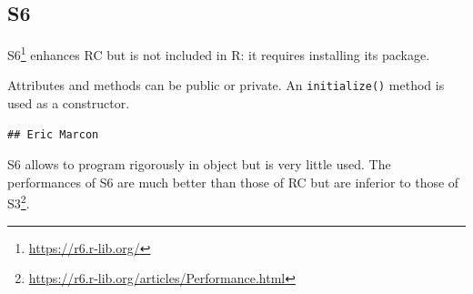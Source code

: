 \documentclass[
  12pt,
  american,
  a4paper,
  extrafontsizes,onecolumn,openright
  ]{memoir}
\newenvironment{Shaded}{\begin{snugshade}}{\end{snugshade}}
\newcommand{\AttributeTok}[1]{\textcolor[rgb]{0.13,0.29,0.53}{#1}}
\newcommand{\ConstantTok}[1]{\textcolor[rgb]{0.56,0.35,0.01}{#1}}
\newcommand{\ControlFlowTok}[1]{\textcolor[rgb]{0.13,0.29,0.53}{\textbf{#1}}}
\newcommand{\FunctionTok}[1]{\textcolor[rgb]{0.13,0.29,0.53}{\textbf{#1}}}
\newcommand{\NormalTok}[1]{#1}
\newcommand{\OtherTok}[1]{\textcolor[rgb]{0.56,0.35,0.01}{#1}}
\newcommand{\SpecialCharTok}[1]{\textcolor[rgb]{0.81,0.36,0.00}{\textbf{#1}}}
\newcommand{\StringTok}[1]{\textcolor[rgb]{0.31,0.60,0.02}{#1}}
\newlength{\rf}
\begin{document}
\subsection{S6}\label{s6}

S6\footnote{\url{https://r6.r-lib.org/}} enhances RC but is not included in R: it requires installing its package.

Attributes and methods can be public or private.
An \texttt{initialize()} method is used as a constructor.

\scriptsize

\begin{Shaded}
\end{Shaded}

\begin{verbatim}
## Eric Marcon
\end{verbatim}

\normalsize

S6 allows to program rigorously in object but is very little used.
The performances of S6 are much better than those of RC but are inferior to those of S3\footnote{\url{https://r6.r-lib.org/articles/Performance.html}}.
\end{document}
